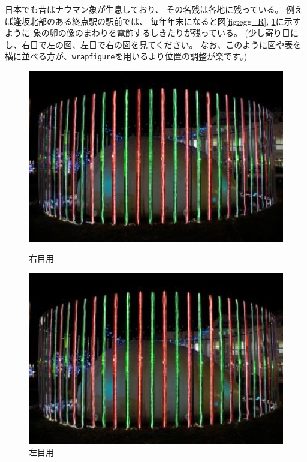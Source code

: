 \documentclass[11pt,a4paper,twoside]{jarticle}
\newcommand{\研究種別}{A}	%
\newcommand{\研究課題名}{Co-Creativeなソフトウェア開発手法向けPBL教材}
\newcommand{\研究機関名}{産業技術大学院大学}
\newcommand{\研究代表者氏名}{中鉢　欣秀}
\newcommand{\研究代表者氏名ふりがな}{ちゅうばち　よしひで}
\newcommand{\本応募effort}{\KLEffort{18}}	%
\newcommand{\研究期間の最終元号年度}{27}	%
\begin{document}
{	日本でも昔はナウマン象が生息しており、
	その名残は各地に残っている。
	例えば逢坂北部のある終点駅の駅前では、
	毎年年末になると図\ref{fig:egg_R}, \ref{fig:egg_L}に示すように
	象の卵の像のまわりを電飾するしきたりが残っている。
	(少し寄り目にし、右目で左の図、左目で右の図を見てください。
	なお、このように図や表を横に並べる方が、{\tt wrapfigure}を用いるより位置の調整が楽です。)
        \begin{figure}[h]
         	\begin{minipage}[t]{0.49\linewidth}
			\includegraphics[width=\linewidth]{figs/egg_R.eps}
			\caption{右目用}
			\label{fig:egg_R}
		\end{minipage}
		\hspace{0.01\linewidth}
		\begin{minipage}[t]{0.49\linewidth}
			\includegraphics[width=\linewidth]{figs/egg_L.eps}
			\caption{左目用}
			\label{fig:egg_L}
		\end{minipage}
         \end{figure}

}
\end{document}
